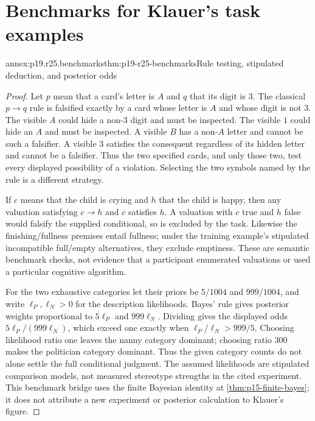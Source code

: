 \section{Benchmarks for Klauer's task examples}
\label{sec:annex-p19-rationality-2-5}

\begin{annexitem}{annex:p19.r25.benchmarks}{thm:p19-r25-benchmarks}{Rule testing, stipulated deduction, and posterior odds}
\begin{proof}
Let \(p\) mean that a card's letter is \(A\) and \(q\) that its
digit is \(3\). The classical \(p\to q\) rule is falsified exactly by a card whose
letter is \(A\) and whose digit is not \(3\). The visible \(A\)
could hide a non-\(3\) digit and must be inspected. The visible
\(1\) could hide an \(A\) and must be inspected. A visible
\(B\) has a non-\(A\) letter and cannot be such a falsifier.
A visible \(3\) satisfies the consequent regardless of its hidden
letter and cannot be a falsifier. Thus the two specified cards, and
only those two, test every displayed possibility of a violation.
Selecting the two symbols named by the rule is a different strategy.

If \(c\) means that the child is crying and \(h\) that the child
is happy, then any valuation satisfying \(c\to h\) and \(c\)
satisfies \(h\). A valuation with \(c\) true and \(h\) false
would falsify the supplied conditional, so is excluded by the task.
Likewise the finishing/fullness premises entail fullness; under the
training example's stipulated incompatible full/empty alternatives,
they exclude emptiness. These are semantic benchmark checks, not
evidence that a participant enumerated valuations or used a particular
cognitive algorithm.

For the two exhaustive categories let their priors be \(5/1004\)
and \(999/1004\), and write \(\ell_P,\ell_N>0\) for the description
likelihoods. Bayes' rule gives posterior weights proportional to
\(5\ell_P\) and \(999\ell_N\). Dividing gives the displayed
odds \(5\ell_P/(999\ell_N)\), which exceed one exactly when
\(\ell_P/\ell_N>999/5\). Choosing likelihood ratio one leaves
the nanny category dominant; choosing ratio 300 makes the politician
category dominant. Thus the given category counts do not alone settle
the full conditional judgment. The assumed likelihoods are stipulated
comparison models, not measured stereotype strengths in the cited
experiment. This benchmark bridge uses the finite Bayesian identity
at \cref{thm:p15-finite-bayes}; it does not attribute a new experiment
or posterior calculation to Klauer's figure.
\end{proof}
\end{annexitem}
